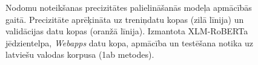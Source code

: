 \begin{figure}[h] 
   \centering
   \caption{Nodomu noteikšanas precizitātes palielināšanās modeļa apmācībās gaitā. Precizitāte aprēķināta uz treniņdatu kopas (zilā līnija) un validācijas datu kopas (oranžā līnija). Izmantota XLM-RoBERTa jēdzientelpa, \textit{Webapps} datu kopa, apmācība un testēšana notika uz latviešu valodas korpusa (1ab metodes).} 
   \label{fig:webapps-xlm}
\end{figure}


